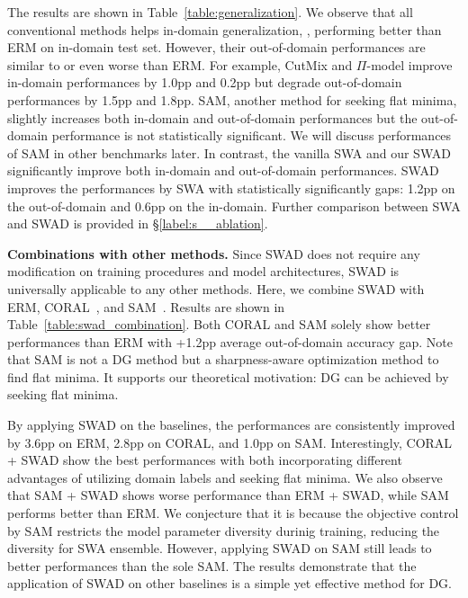 The results are shown in Table~\ref{table:generalization}.
We observe that all conventional methods helps in-domain generalization, \ie, performing better than ERM on in-domain test set. However, their out-of-domain performances are similar to or even worse than ERM.
For example, CutMix and $\Pi$-model improve in-domain performances by 1.0pp and 0.2pp but degrade out-of-domain performances by 1.5pp and 1.8pp. 
SAM, another method for seeking flat minima, slightly increases both in-domain and out-of-domain performances but the out-of-domain performance is not statistically significant.
We will discuss performances of SAM in other benchmarks later.
In contrast, the vanilla SWA and our SWAD significantly improve both in-domain and out-of-domain performances. SWAD improves the performances by SWA with statistically significantly gaps: 1.2pp on the out-of-domain and 0.6pp on the in-domain. Further comparison between SWA and SWAD is provided in \S\ref{label:s__ablation}.



\textbf{Combinations with other methods.}
Since SWAD does not require any modification on training procedures and model architectures, SWAD is universally applicable to any other methods. Here, we combine SWAD with ERM, CORAL~\cite{sun2016coral}, and SAM~\cite{foret2020sharpness}. Results are shown in Table~\ref{table:swad_combination}.
Both CORAL and SAM solely show better performances than ERM with +1.2pp average out-of-domain accuracy gap.
Note that SAM is not a DG method but a sharpness-aware optimization method to find flat minima.
It supports our theoretical motivation: DG can be achieved by seeking flat minima.

By applying SWAD on the baselines, the performances are consistently improved by 3.6pp on ERM, 2.8pp on CORAL, and 1.0pp on SAM. Interestingly, CORAL + SWAD show the best performances with both incorporating different advantages of utilizing domain labels and seeking flat minima.
We also observe that SAM + SWAD shows worse performance than ERM + SWAD, while SAM performs better than ERM.
We conjecture that it is because the objective control by SAM restricts the model parameter diversity durinig training, reducing the diversity for SWA ensemble.
However, applying SWAD on SAM still leads to better performances than the sole SAM. The results demonstrate that the application of SWAD on other baselines is a simple yet effective method for DG. 


